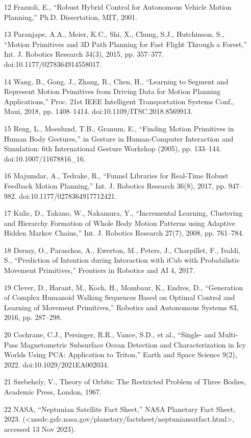 \documentclass[12pt]{article}
\begin{document}
\begin{enumerate}
\item [12] Frazzoli, E., ``Robust Hybrid Control for Autonomous Vehicle Motion Planning,'' Ph.D. Dissertation, MIT, 2001.
\item [13] Paranjape, A.A., Meier, K.C., Shi, X., Chung, S.J., Hutchinson, S., ``Motion Primitives and 3D Path Planning for Fast Flight Through a Forest,'' Int. J. Robotics Research 34(3), 2015, pp. 357--377. doi:10.1177/0278364914558017.
\item [14] Wang, B., Gong, J., Zhang, R., Chen, H., ``Learning to Segment and Represent Motion Primitives from Driving Data for Motion Planning Applications,'' Proc. 21st IEEE Intelligent Transportation Systems Conf., Maui, 2018, pp. 1408--1414. doi:10.1109/ITSC.2018.8569913.
\item [15] Reng, L., Moeslund, T.B., Granum, E., ``Finding Motion Primitives in Human Body Gestures,'' in Gesture in Human-Computer Interaction and Simulation: 6th International Gesture Workshop (2005), pp. 133--144. doi:10.1007/11678816_16.
\item [16] Majumdar, A., Tedrake, R., ``Funnel Libraries for Real-Time Robust Feedback Motion Planning,'' Int. J. Robotics Research 36(8), 2017, pp. 947--982. doi:10.1177/0278364917712421.
\item [17] Kulic, D., Takano, W., Nakamura, Y., ``Incremental Learning, Clustering and Hierarchy Formation of Whole Body Motion Patterns using Adaptive Hidden Markov Chains,'' Int. J. Robotics Research 27(7), 2008, pp. 761--784.
\item [18] Dermy, O., Paraschos, A., Ewerton, M., Peters, J., Charpillet, F., Ivaldi, S., ``Prediction of Intention during Interaction with iCub with Probabilistic Movement Primitives,'' Frontiers in Robotics and AI 4, 2017.
\item [19] Clever, D., Harant, M., Koch, H., Mombaur, K., Endres, D., ``Generation of Complex Humanoid Walking Sequences Based on Optimal Control and Learning of Movement Primitives,'' Robotics and Autonomous Systems 83, 2016, pp. 287--298.
\item [20] Cochrane, C.J., Persinger, R.R., Vance, S.D., et al., ``Single- and Multi-Pass Magnetometric Subsurface Ocean Detection and Characterization in Icy Worlds Using PCA: Application to Triton,'' Earth and Space Science 9(2), 2022. doi:10.1029/2021EA002034.
\item [21] Szebehely, V., Theory of Orbits: The Restricted Problem of Three Bodies, Academic Press, London, 1967.
\item [22] NASA, ``Neptunian Satellite Fact Sheet,'' NASA Planetary Fact Sheet, 2023. (<nssdc.gsfc.nasa.gov/planetary/factsheet/neptuniansatfact.html>, accessed 13 Nov 2023).

\end{enumerate}
\end{document}
